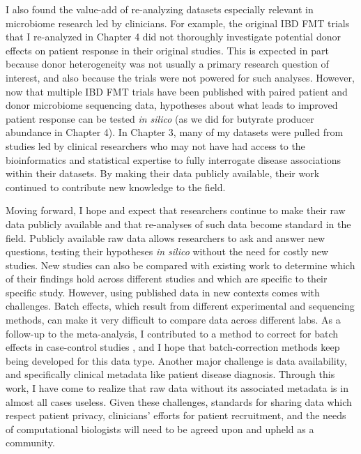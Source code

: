 I also found the value-add of re-analyzing datasets especially relevant in microbiome research led by clinicians.
For example, the original IBD FMT trials that I re-analyzed in Chapter 4 did not thoroughly investigate potential donor effects on patient response in their original studies.
This is expected in part because donor heterogeneity was not usually a primary research question of interest, and also because the trials were not powered for such analyses.
However, now that multiple IBD FMT trials have been published with paired patient and donor microbiome sequencing data, hypotheses about what leads to improved patient response can be tested \textit{in silico} (as we did for butyrate producer abundance in Chapter 4).
In Chapter 3, many of my datasets were pulled from studies led by clinical researchers who may not have had access to the bioinformatics and statistical expertise to fully interrogate disease associations within their datasets.
By making their data publicly available, their work continued to contribute new knowledge to the field.

Moving forward, I hope and expect that researchers continue to make their raw data publicly available and that re-analyses of such data become standard in the field.
Publicly available raw data allows researchers to ask and answer new questions, testing their hypotheses \textit{in silico} without the need for costly new studies.
New studies can also be compared with existing work to determine which of their findings hold across different studies and which are specific to their specific study.
However, using published data in new contexts comes with challenges.
Batch effects, which result from different experimental and sequencing methods, can make it very difficult to compare data across different labs.
As a follow-up to the meta-analysis, I contributed to a method to correct for batch effects in case-control studies \cite{gibbons-2018}, and I hope that batch-correction methods keep being developed for this data type.
Another major challenge is data availability, and specifically clinical metadata like patient disease diagnosis.
Through this work, I have come to realize that raw data without its associated metadata is in almost all cases useless.
Given these challenges, standards for sharing data which respect patient privacy, clinicians' efforts for patient recruitment, and the needs of computational biologists will need to be agreed upon and upheld as a community.

